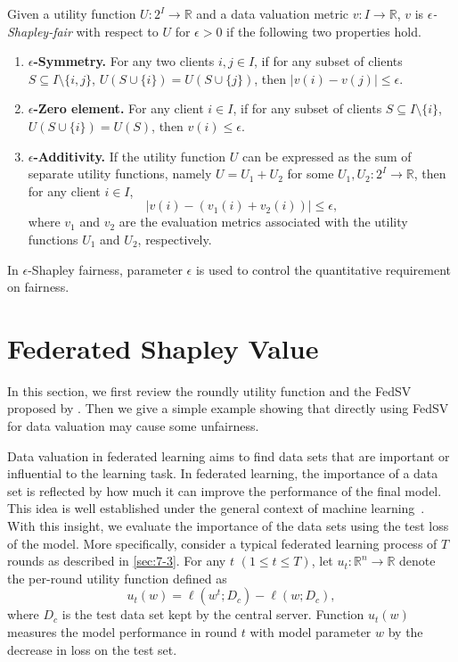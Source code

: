 \begin{definition} \label{def:hfl_fairness}
    Given a utility function $U:2^I \to \mathbb{R}$ and a data valuation metric $v: I \to \mathbb{R}$, $v$ is \emph{$\epsilon$-Shapley-fair} with respect to $U$ for $\epsilon > 0$ if the following two properties hold.
    \begin{enumerate}
    \item \textbf{$\epsilon$-Symmetry.} For any two clients $i, j \in I$, if for any subset of clients $S \subseteq I \setminus \{i,j\}$, $U(S \cup \{i\}) = U(S \cup \{j\})$, then $|v(i) - v(j)| \leq \epsilon$. 
    \item \textbf{$\epsilon$-Zero element.} For any client $i \in I$, if for any subset of clients $S \subseteq I \setminus \{i\}$, $U(S \cup \{i\}) = U(S)$, then $v(i) \leq \epsilon$.
    \item \textbf{$\epsilon$-Additivity.} If the utility function $U$ can be expressed as the sum of separate utility functions, namely $U = U_1 + U_2$ for some $U_1, U_2 : 2^I \to \mathbb{R}$, then for any client $i \in I$, 
    \[|v(i) - (v_1(i)  + v_2(i))| \leq \epsilon,\]
    where $v_1$ and $v_2$ are the evaluation metrics associated with the utility functions $U_1$ and $U_2$, respectively. 
\end{enumerate}
\end{definition}
In $\epsilon$-Shapley fairness, parameter $\epsilon$ is used to control the quantitative requirement on fairness. 

\section{Federated Shapley Value} \label{sec:7-5}

In this section, we first review the roundly utility function and the FedSV proposed by \citet{wang2020principled}. Then we give a simple example showing that directly using FedSV for data valuation may cause some unfairness. 

Data valuation in federated learning aims to find data sets that are important or influential to the learning task. In federated learning, the importance of a data set is reflected by how much it can improve the performance of the final model. This idea is well established under the general context of machine learning~\citep{ghorbani2019data}. With this insight, we evaluate the importance of the data sets using the test loss of the model. More specifically, consider a typical federated learning process of $T$ rounds as described in \autoref{sec:7-3}. For any $t$ $(1 \leq t \leq T)$, let $u_t: \mathbb{R}^n \to \mathbb{R}$ denote the per-round utility function defined as
\begin{equation} \label{eq:utility}
    u_t(w) = \ell(w^t; D_c) - \ell(w; D_c),
\end{equation}
where $D_c$ is the test data set kept by the central server. Function $u_t(w)$ measures the model performance in round $t$ with model parameter $w$ by the decrease in loss on the test set. 

